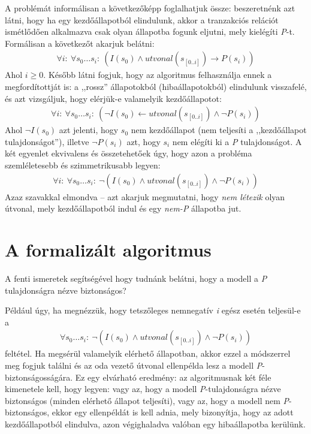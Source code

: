 A problémát informálisan a következőképp foglalhatjuk össze: beszeretnénk azt látni, hogy ha egy kezdőállapotból elindulunk, akkor a tranzakciós relációt ismétlődően alkalmazva csak olyan állapotba fogunk eljutni, mely kielégíti \emph{P}-t. Formálisan a következőt akarjuk belátni:
\begin{align}
	\forall i:~\forall s_{0} \dots s_{i}:~(I(s_{0}) \wedge utvonal(s_{[0..i]}) \rightarrow P(s_{i}))
\end{align}
Ahol $i \geq 0$. Később látni fogjuk, hogy az algoritmus felhasználja ennek a megfordítottját is: a ,,rossz'' állapotokból (hibaállapotokból) elindulunk visszafelé, és azt vizsgáljuk, hogy elérjük-e valamelyik kezdőállapotot:
\begin{align}
	\forall i:~\forall s_{0} \dots s_{i}:~(\neg I(s_{0}) \leftarrow utvonal(s_{[0..i]}) \wedge \neg P(s_{i}))
\end{align}
Ahol $\neg I(s_{0})$ azt jelenti, hogy $s_{0}$ nem kezdőállapot (nem teljesíti a ,,kezdőállapot tulajdonságot''), illetve $\neg P(s_{i})$ azt, hogy $s_{i}$ nem elégíti ki a \emph{P} tulajdonságot. A két egyenlet ekvivalens és összetehetőek úgy, hogy azon a probléma szemléletesebb és szimmetrikusabb legyen:
\begin{align}
	\forall i:~\forall s_{0} \dots s_{i}:~\neg(I(s_{0}) \wedge utvonal(s_{[0..i]}) \wedge \neg P(s_{i}))
\end{align}
Azaz szavakkal elmondva -- azt akarjuk megmutatni, hogy \emph{nem létezik} olyan útvonal, mely kezdőállapotból indul és egy \emph{nem-P} állapotba jut.

\section{A formalizált algoritmus}

A fenti ismeretek segítségével hogy tudnánk belátni, hogy a modell a \emph{P} tulajdonságra nézve biztonságos?

Például úgy, ha megnézzük, hogy tetszőleges nemnegatív \emph{i} egész esetén teljesül-e a
\begin{align}
	\forall s_{0} \dots s_{i}:~\neg(I(s_{0}) \wedge utvonal(s_{[0..i]}) \wedge \neg P(s_{i}))
\end{align}
feltétel. Ha megsérül valamelyik elérhető állapotban, akkor ezzel a módszerrel meg fogjuk találni és az oda vezető útvonal ellenpélda lesz a modell \emph{P}-biztonságosságára. Ez egy elvárható eredmény: az algoritmusnak két féle kimenetele kell, hogy legyen: vagy az, hogy a modell \emph{P}-tulajdonságra nézve biztonságos (minden elérhető állapot teljesíti), vagy az, hogy a modell nem \emph{P}-biztonságos, ekkor egy ellenpéldát is kell adnia, mely bizonyítja, hogy az adott kezdőállapotból elindulva, azon végighaladva valóban egy hibaállapotba kerülünk.

